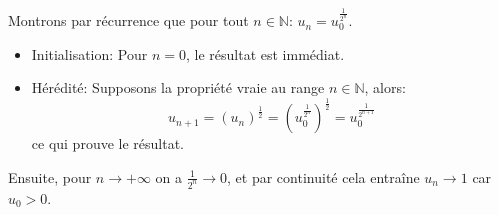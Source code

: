 Montrons par récurrence que pour tout $n\in\mathbb{N}$: $u_n=u_0^{\frac{1}{2^n}}$.
\begin{itemize}
  \item Initialisation: Pour $n=0$, le résultat est immédiat.
  \item Hérédité: Supposons la propriété vraie au range $n\in\mathbb{N}$, alors:
  \[
  u_{n+1} = (u_n)^{\frac{1}{2}}=\left(u_0^{\frac{1}{2^n}}\right)^{\frac{1}{2}} = u_0^{\frac{1}{2^{n+1}}}
  \]
  ce qui prouve le résultat.
\end{itemize}
Ensuite, pour $n\to +\infty$ on a $\frac{1}{2^n}\to 0$, et par continuité cela entraîne $u_n\to 1$ car $u_0>0$.
